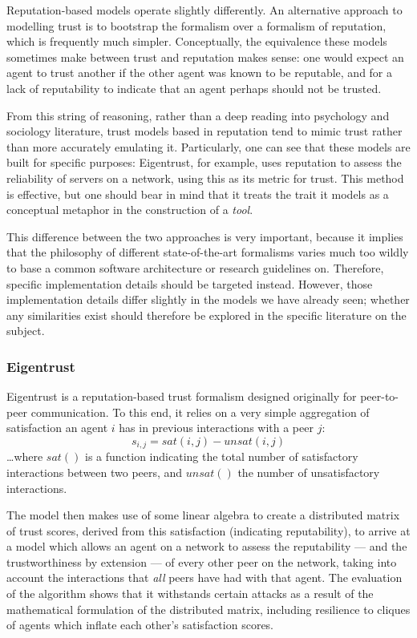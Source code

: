 \documentclass[11pt,english,twocolumn]{article}
\begin{document}
Reputation-based models operate slightly differently. An alternative approach to modelling trust is to bootstrap the formalism over a formalism of reputation, which is frequently much simpler. Conceptually, the equivalence these models sometimes make between trust and reputation makes sense: one would expect an agent to trust another if the other agent was known to be reputable, and for a lack of reputability to indicate that an agent perhaps should not be trusted.\par

From this string of reasoning, rather than a deep reading into psychology and sociology literature, trust models based in reputation tend to mimic trust rather than more accurately emulating it. Particularly, one can see that these models are built for specific purposes: Eigentrust\cite{Kamvar2003}, for example, uses reputation to assess the reliability of servers on a network, using this as its metric for trust. This method is effective, but one should bear in mind that it treats the trait it models as a conceptual metaphor in the construction of a \emph{tool}.\par

This difference between the two approaches is very important, because it implies that the philosophy of different state-of-the-art formalisms varies much too wildly to base a common software architecture or research guidelines on. Therefore, specific implementation details should be targeted instead. However, those implementation details differ slightly in the models we have already seen; whether any similarities exist should therefore be explored in the specific literature on the subject.\par

\subsubsection{Eigentrust}
Eigentrust\cite{Kamvar2003} is a reputation-based trust formalism designed originally for peer-to-peer communication. To this end, it relies on a very simple aggregation of satisfaction an agent \(i\) has in previous interactions with a peer \(j\):
\[s_{i,j} = sat(i,j) - unsat(i,j)\]
\ldots{}where \(sat()\) is a function indicating the total number of satisfactory interactions between two peers, and \(unsat()\) the number of unsatisfactory interactions.\par

The model then makes use of some linear algebra to create a distributed matrix of trust scores, derived from this satisfaction (indicating reputability), to arrive at a model which allows an agent on a network to assess the reputability --- and the trustworthiness by extension --- of every other peer on the network, taking into account the interactions that \emph{all} peers have had with that agent. The evaluation of the algorithm shows that it withstands certain attacks as a result of the mathematical formulation of the distributed matrix, including resilience to cliques of agents which inflate each other's satisfaction scores.\par
\end{document}
